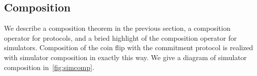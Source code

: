 \subsection{Composition}
We describe a composition theorem in the previous section, a composition operator for protocols, and a bried highlight of the composition operator for simulators.
Composition of the coin flip with the commitment protocol is realized with simulator composition in exactly this way.
We give a diagram of simulator composition in~\ref{fig:simcomp}.
%

